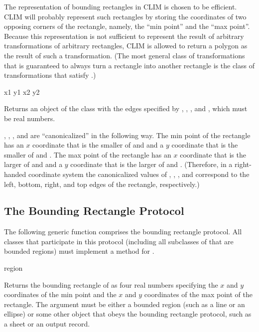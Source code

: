 The representation of bounding rectangles in CLIM is chosen to be efficient.
CLIM will probably represent such rectangles by storing the coordinates of two
opposing corners of the rectangle, namely, the ``min point'' and the ``max
point''.  Because this representation is not sufficient to represent the result
of arbitrary transformations of arbitrary rectangles, CLIM is allowed to return
a polygon as the result of such a transformation.  (The most general class of
transformations that is guaranteed to always turn a rectangle into another
rectangle is the class of transformations that satisfy
.)

 {x1 y1 x2 y2}

Returns an object of the class  with the edges
specified by , , , and , which must be real
numbers.

, , , and  are ``canonicalized'' in the
following way.  The min point of the rectangle has an $x$ coordinate that is the
smaller of  and  and a $y$ coordinate that is the smaller of
 and .  The max point of the rectangle has an $x$ coordinate
that is the larger of  and  and a $y$ coordinate that is the
larger of  and .  (Therefore, in a right-handed coordinate
system the canonicalized values of , , , and 
correspond to the left, bottom, right, and top edges of the rectangle,
respectively.)

\FreshOutputs


\subsection {The Bounding Rectangle Protocol}

The following generic function comprises the bounding rectangle protocol.  All
classes that participate in this protocol (including all subclasses of
 that are bounded regions) must implement a method for
.

 {region}

Returns the bounding rectangle of  as four real numbers specifying
the $x$ and $y$ coordinates of the min point and the $x$ and $y$ coordinates of
the max point of the rectangle.  The argument  must be either a
bounded region (such as a line or an ellipse) or some other object that obeys
the bounding rectangle protocol, such as a sheet or an output record.


